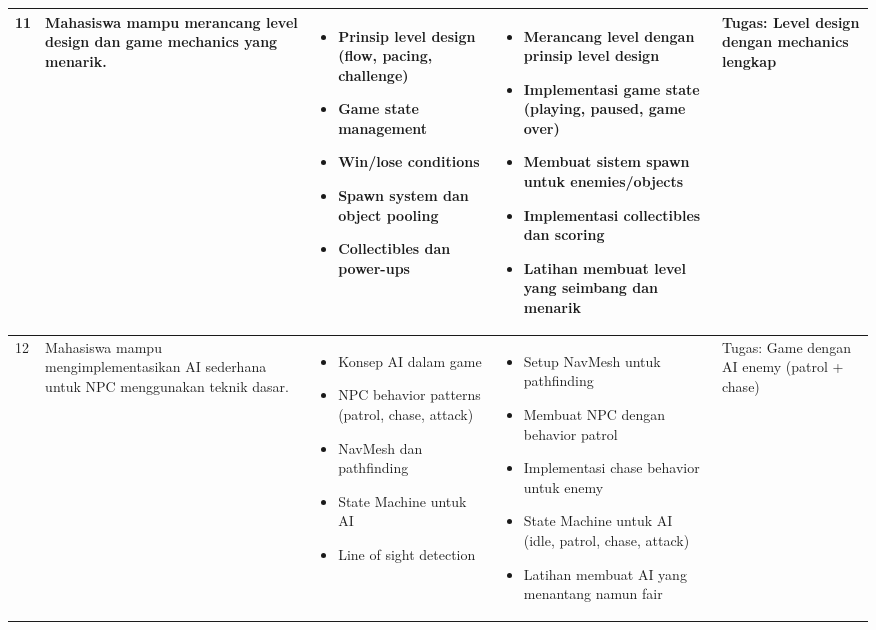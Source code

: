 \begin{longtable}{|p{0.8cm}|p{3.5cm}|p{4cm}|p{4cm}|p{2.5cm}|}
11 & Mahasiswa mampu merancang level design dan game mechanics yang menarik. & 
\begin{itemize}[leftmargin=*,nosep]
\item Prinsip level design (flow, pacing, challenge)
\item Game state management
\item Win/lose conditions
\item Spawn system dan object pooling
\item Collectibles dan power-ups
\end{itemize} & 
\begin{itemize}[leftmargin=*,nosep]
\item Merancang level dengan prinsip level design
\item Implementasi game state (playing, paused, game over)
\item Membuat sistem spawn untuk enemies/objects
\item Implementasi collectibles dan scoring
\item Latihan membuat level yang seimbang dan menarik
\end{itemize} & 
Tugas: Level design dengan mechanics lengkap \\
\hline

12 & Mahasiswa mampu mengimplementasikan AI sederhana untuk NPC menggunakan teknik dasar. & 
\begin{itemize}[leftmargin=*,nosep]
\item Konsep AI dalam game
\item NPC behavior patterns (patrol, chase, attack)
\item NavMesh dan pathfinding
\item State Machine untuk AI
\item Line of sight detection
\end{itemize} & 
\begin{itemize}[leftmargin=*,nosep]
\item Setup NavMesh untuk pathfinding
\item Membuat NPC dengan behavior patrol
\item Implementasi chase behavior untuk enemy
\item State Machine untuk AI (idle, patrol, chase, attack)
\item Latihan membuat AI yang menantang namun fair
\end{itemize} & 
Tugas: Game dengan AI enemy (patrol + chase) \\
\hline


\end{longtable}
